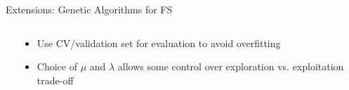 \documentclass[11pt,compress,t,notes=noshow, xcolor=table]{beamer}
\begin{document}
\begin{vbframe}{Extensions: Genetic Algorithms for FS}
\begin{columns}[c]
\begin{column}{0.5\textwidth}
    \end{column}
    \begin{column}{0.5\textwidth}
        \begin{itemize}
        \setlength{\itemsep}{1.2em}
            \item Use CV/validation set for evaluation to avoid overfitting
            \item Choice of $\mu$ and $\lambda$ allows some control over exploration vs. exploitation trade-off
        \end{itemize}
    \end{column}
\end{columns}

\end{vbframe}

\end{document}
